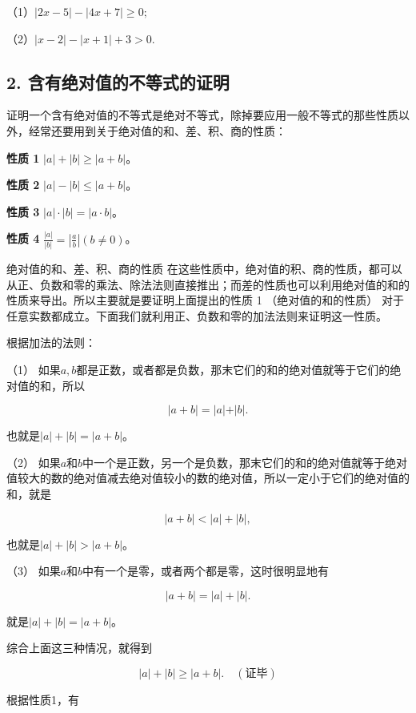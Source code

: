 （1）\(|2x-5|-|4x+7|\geq0;\)

（2）\(|x-2|-|x+1|+3>0.\)

\subsection{2. 含有绝对值的不等式的证明}

证明一个含有绝对值的不等式是绝对不等式，除掉要应用一般不等式的那些性质以外，经常还要用到关于绝对值的和、差、积、商的性质：

\textbf{性质 1}
\(\left|a\right|+\left|b\right|\geqslant\left|a+b\right|\)。

\textbf{性质 2}
\(\left|a\right|-\left|b\right|\leqslant\left|a+b\right|\)。

\textbf{性质 3}
\(\left|a\right|\cdot\left|b\right|=\left|a\cdot b\right|\)。

\textbf{性质 4}
\(\frac{|a|}{|b|}=\left|\frac{a}{b}\right|\)\((b\neq0)\)。

绝对值的和、差、积、商的性质
在这些性质中，绝对值的积、商的性质，都可以从正、负数和零的乘法、除法法则直接推出；而差的性质也可以利用绝对值的和的性质来导出。所以主要就是要证明上面提出的性质
1 （绝对值的和的性质）
对于任意实数都成立。下面我们就利用正、负数和零的加法法则来证明这一性质。

 根据加法的法则：

（1）
如果\(a, b\)都是正数，或者都是负数，那末它们的和的绝对值就等于它们的绝对值的和，所以

\[
\vert a + b \vert = \vert a \vert + \vert b \vert.
\]

也就是\(|a| + |b| = |a + b|\)。

（2）
如果\(a\)和\(b\)中一个是正数，另一个是负数，那末它们的和的绝对值就等于绝对值较大的数的绝对值减去绝对值较小的数的绝对值，所以一定小于它们的绝对值的和，就是

\[
\left| a + b \right| < \left| a \right| + \left| b \right|,
\]

也就是\(|a| + |b| > |a + b|\)。

（3） 如果\(a\)和\(b\)中有一个是零，或者两个都是零，这时很明显地有

\[
\left| a + b \right| = \left| a \right| + \left| b \right|.
\]

就是\(|a| + |b| = |a + b|\)。

综合上面这三种情况，就得到

\[
\left| a \right| + \left| b \right| \geqslant \left| a + b \right|. \quad (\text{证毕})
\]

根据性质1，有

